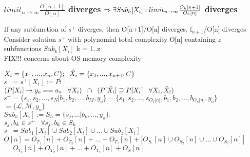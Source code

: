 \documentclass[11pt]{article}
\begin{document}
\subsubsection{$limit_{n \rightarrow \infty} \frac{O[n+1]}{O[n]}$  diverges $\Rightarrow\\ \exists Sub_h[X_i]: limit_{n \rightarrow \infty} \frac{O_h[n+1]}{O_h[n]}$ diverges}
If any subfunction of $s^+$ diverges, then O[n+1]/O[n] diverges, f$_{n+1}$/O[n] diverges
Consider solution $s^+$ with polynomial total complexity O[n] containing $z$ subfunctions $Sub_k[X_i]$ k = 1..z\\
FIX!!! concerns about OS memory complexity
\vspace{1mm}
\begin{center}
$
X_i = \{x_1,...,x_n,C\}; \hspace{2mm} \hat{X}_i = \{x_1,...,x_{n+1},C\}
$
\\ \vspace{2mm}
$
s^+ = s^+[X_i] := P :
$
\\ \vspace{2mm}
$
(P \lbrack X_i \rbrack \rightarrow y_{o} == a_{o} \hspace{3mm} \forall X_i) \hspace{2mm} \cap \hspace{2mm} (P[\hat{X}_i] \supseteq P[X_i] \hspace{3mm} \forall X_i,\hat{X}_i)
$
\\ \vspace{4mm}
$
s^+ = \{ s_1,s_2,...,s_N|b_1,b_2,...,b_M,y_o\} = \{ s_1,s_2,...,s_{O_T \lbrack n \rbrack }, b_1, b_2,...,b_{O_S \lbrack n \rbrack},y_o \}
$
\\ \vspace{2mm}
$
= \{ \mathcal{L},\mathcal{M},y_o\}
$
\\ \vspace{6mm}
$
Sub_h[X_i] := S_h = \{s_j,...|b_k,...,y_o\}:
$
\\ \vspace{2mm}
$
s_j, b_k \in s^+ \hspace{3mm} \forall s_j,b_k \in S_h
$
\\ \vspace{6mm}
$
s^+ = Sub_1[X_i] \cup Sub_2[X_i] \cup ... \cup Sub_z[X_i]
$
\\ \vspace{6mm}
$
O[n] = O_{T_1}[n] + O_{T_2}[n] + ... + O_{T_z}[n] + |O_{S_1}[n] \cup O_{S_2}[n] \cup  ... \cup O_{S_z}[n]|
$
\\ \vspace{2mm}
$
= O_{T_1}[n] + O_{T_2}[n] + ... + O_{T_z}[n] + O_S[n]
$
\end{center}
\end{document}
